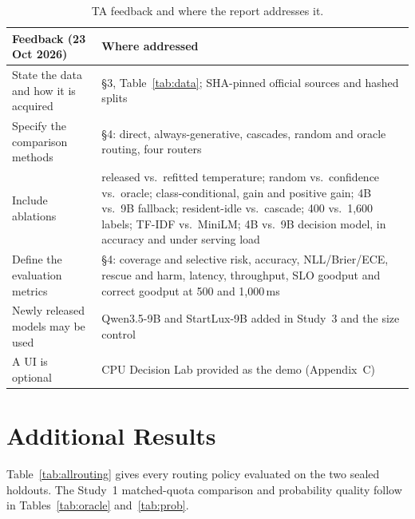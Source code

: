 \documentclass[11pt]{article}
\begin{document}
\begin{table}[h]
\centering
\small
\begin{tabular}{p{}p{}}
\toprule
Feedback (23 Oct 2026) & Where addressed \\
\midrule
State the data and how it is acquired & \S3, Table~\ref{tab:data}; SHA-pinned official sources and hashed splits \\
Specify the comparison methods & \S4: direct, always-generative, cascades, random and oracle routing, four routers \\
Include ablations & released vs.\ refitted temperature; random vs.\ confidence vs.\ oracle; class-conditional, gain and positive gain; 4B vs.\ 9B fallback; resident-idle vs.\ cascade; 400 vs.\ 1,600 labels; TF-IDF vs.\ MiniLM; 4B vs.\ 9B decision model, in accuracy and under serving load \\
Define the evaluation metrics & \S4: coverage and selective risk, accuracy, NLL/Brier/ECE, rescue and harm, latency, throughput, SLO goodput and correct goodput at 500 and 1,000\,ms \\
Newly released models may be used & Qwen3.5-9B and StartLux-9B added in Study~3 and the size control \\
A UI is optional & CPU Decision Lab provided as the demo (Appendix~C) \\
\bottomrule
\end{tabular}
\caption{TA feedback and where the report addresses it.}
\label{tab:ta}
\end{table}

\section{Additional Results}

Table~\ref{tab:allrouting} gives every routing policy evaluated on the two sealed holdouts. The Study~1 matched-quota comparison and probability quality follow in Tables~\ref{tab:oracle} and~\ref{tab:prob}.
\end{document}
